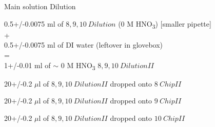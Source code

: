 \documentclass[idxtotoc,hyperref,openany,oneside]{labbook} %
\newcommand{\cmark}{\ding{51}}%
\newcommand{\done}{\rlap{$\square$}{\raisebox{2pt}{\large\hspace{1pt}\cmark}}%
  \hspace{-2.5pt}}
\newcommand{\tsbs}{\textsubscript}
\begin{document}
\begin{todolist}
\item[\done]{Main solution Dilution}
\begin{center}
  0.5+/-0.0075 ml of $\boxed{8,9,10\ Dilution}$ (0 M HNO\tsbs{3})
  [smaller pipette]\\
+\\
0.5+/-0.0075 ml of DI water (leftover in glovebox)\\
=\\
1+/-0.01 ml of $\sim$ 0 M HNO\tsbs{3} $\boxed{8,9,10\ DilutionII}$
\end{center}
\vspace{0.3cm}
\begin{center}
  20+/-0.2 $\mu$l of $\boxed{8,9,10\ DilutionII}$ dropped onto
  $\boxed{8\ ChipII}$
\end{center}
\begin{center}
  20+/-0.2 $\mu$l of $\boxed{8,9,10\ DilutionII}$ dropped onto
  $\boxed{9\ ChipII}$
\end{center}
\begin{center}
  20+/-0.2 $\mu$l of $\boxed{8,9,10\ DilutionII}$ dropped onto
  $\boxed{10\ ChipII}$
\end{center}


\end{todolist}
\end{document}
